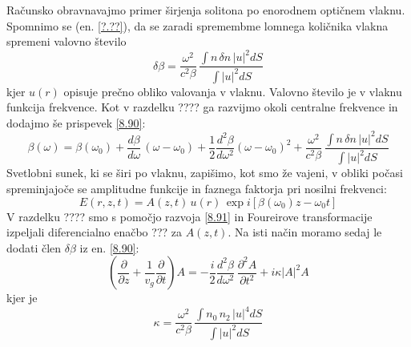 \documentclass[11pt,fleqn]{book} %
\begin{document}
Računsko obravnavajmo primer širjenja solitona po enorodnem optičnem
vlaknu. Spomnimo se (en. \ref{?.??}), da se zaradi spremembme lomnega
količnika vlakna spremeni valovno število 
\begin{equation}
\delta\beta=\frac{\omega^{2}}{c^{2}\beta}\,\frac{\int n\,\delta n\,|u|^{2}dS}{\int|u|^{2}dS}\label{8.90}
\end{equation}
 kjer $u(r)$ opisuje prečno obliko valovanja v vlaknu. Valovno število
je v vlaknu funkcija frekvence. Kot v razdelku ???? ga razvijmo okoli
centralne frekvence in dodajmo še prispevek \ref{8.90}: 
\begin{equation}
\beta\left(\omega\right)=\beta\left(\omega_{0}\right)+\frac{d\beta}{d\omega}\,(\omega-\omega_{0})+\frac{1}{2}\frac{d^{2}\beta}{d\omega^{2}}(\omega-\omega_{0})^{2}+\frac{\omega^{2}}{c^{2}\beta}\,\frac{\int n\,\delta n\,|u|^{2}dS}{\int|u|^{2}dS}\label{8.91}
\end{equation}
 Svetlobni sunek, ki se širi po vlaknu, zapišimo, kot smo že vajeni,
v obliki počasi spreminjajoče se amplitudne funkcije in faznega faktorja
pri nosilni frekvenci: 
\begin{equation}
E\left(r,z,t\right)=A\left(z,t\right)\, u\left(r\right)\,\exp i\left[\beta\left(\omega_{0}\right)z-\omega_{0}t\right]\label{8.92}
\end{equation}
 V razdelku ???? smo s pomočjo razvoja \ref{8.91} in Foureirove transformacije
izpeljali diferencialno enačbo ??? za $A\left(z,t\right)$. Na isti
način moramo sedaj le dodati člen $\delta\beta$ iz en. \ref{8.90}:
\begin{equation}
(\frac{\partial}{\partial z}+\frac{1}{v_{g}}\frac{\partial}{\partial t})A=-\frac{i}{2}\frac{d^{2}\beta}{d\omega^{2}}\,\frac{\partial^{2}A}{\partial t^{2}}+i\kappa|A|^{2}A\label{8.93}
\end{equation}
 kjer je 
\begin{equation}
\kappa=\frac{\omega^{2}}{c^{2}\beta}\,\frac{\int n_{0}\, n_{2}\,|u|^{4}dS}{\int|u|^{2}dS}\label{8.94}
\end{equation}
\end{document}
